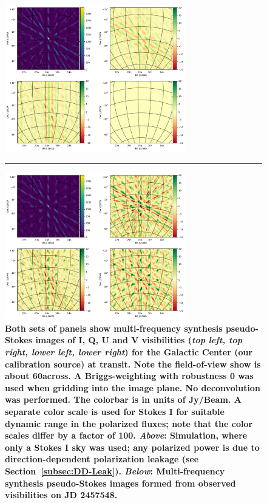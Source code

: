 \documentclass[twocolumn, trackchanges]{aastex61}
\newcommand{\edited}[1]{{\bf \color{blue} #1}}
\begin{document}
{\begin{figure}
\centering
\includegraphics[width=0.7\textwidth]{sim4pol_new.pdf}
\vspace{-0.1in}
\par\noindent\rule{0.8\textwidth}{0.4pt}
\includegraphics[width=0.7\textwidth]{real4pol_new.pdf}
\caption{\edited{
Both sets of panels show multi-frequency synthesis pseudo-Stokes images of I, Q, U and V visibilities (\textit{top left, top right, lower left, lower right}) for the Galactic Center (our calibration source) at transit.  Note the field-of-view show is about 60\arcdeg across.
A Briggs-weighting with robustness 0 was used when gridding into the image plane. 
No deconvolution was performed. 
The colorbar is in units of Jy/Beam.
A separate color scale is used for Stokes I for suitable dynamic range in the polarized fluxes; note that the color scales differ by a factor of 100.
\textit{Above}:  Simulation, where only a Stokes I sky was used; any polarized power is due to direction-dependent polarization leakage (see Section~\ref{subsec:DD-Leak}).
\textit{Below}: Multi-frequency synthesis pseudo-Stokes images formed from observed visibilities on JD 2457548.}
}
\label{fig:GCimage}
\end{figure}


}
\end{document}
